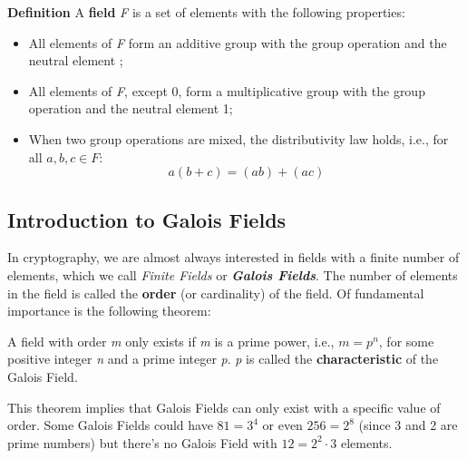 \begin{framed}
\hfill\break\textbf{Definition} A \textbf{field} \textit{F} is a set of elements with the following properties:
\begin{itemize}
    \item All elements of \textit{F} form an additive group with the group operation \doublequotes{+} and the neutral element ;
    \item All elements of \textit{F}, except 0, form a multiplicative group with the group operation \doublequotes{$\times$} and the neutral element 1;
    \item When two group operations are mixed, the distributivity law holds, i.e., for all $a,b,c\in F$:$$a(b+c)=(ab)+(ac)$$
\end{itemize}
\end{framed}

\newpage
\subsection{Introduction to Galois Fields}
In cryptography, we are almost always interested in fields with a finite number of elements, which we call \textit{Finite Fields} or \textbf{\textit{Galois Fields}}. The number of elements in the field is called the \textbf{order} (or cardinality) of the field. Of fundamental importance is the following theorem:
\begin{framed}
    A field with order \textit{m} only exists if \textit{m} is a prime power, i.e., $m=p^n$, for some positive integer \textit{n} and a prime integer \textit{p}. \textit{p} is called the \textbf{characteristic} of the Galois Field.
\end{framed}
\hfill\break
This theorem implies that Galois Fields can only exist with a specific value of order. Some Galois Fields could have $81=3^4$ or even $256=2^8$ (since 3 and 2 are prime numbers) but there's no Galois Field with $12=2^2\cdot3$ elements.

